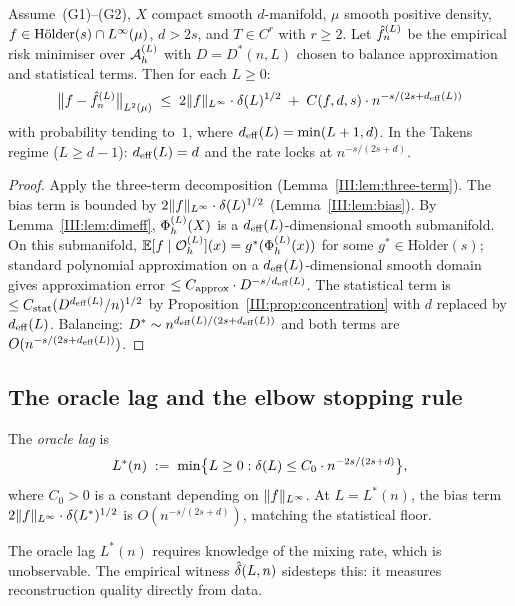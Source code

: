 \begin{proposition}
\label{III:prop:piecewise-rate}
Assume~(G1)--(G2), $X$ compact smooth $d$-manifold, $\mu$ smooth positive
density, $f \in \mathrm{H\ddot{o}lder}(s) \cap L^{\infty}(\mu)$, $d > 2s$,
and $T \in C^r$ with $r \geq 2$.
Let $\hat{f}_n^{(L)}$ be the empirical risk minimiser over $\mathcal{A}_h^{(L)}$ with $D = D^*(n,L)$
chosen to balance approximation and statistical terms.
Then for each $L \geq 0$:
\[
  \bigl\|f - \hat{f}_n^{(L)}\bigr\|_{L^{2}(\mu)}
  \;\leq\;
  2\|f\|_{L^{\infty}} \cdot \delta(L)^{1/2}
  \;+\;
  C(f,d,s) \cdot n^{-s/(2s+d_{\mathrm{eff}}(L))}
\]
with probability tending to~$1$, where $d_{\mathrm{eff}}(L) = \min(L+1,d)$.
In the Takens regime ($L \geq d-1$): $d_{\mathrm{eff}}(L) = d$ and the rate locks at
$n^{-s/(2s+d)}$.
\end{proposition}

\begin{proof}
Apply the three-term decomposition (Lemma~\ref{III:lem:three-term}).
The bias term is bounded by $2\|f\|_{L^{\infty}} \cdot \delta(L)^{1/2}$
(Lemma~\ref{III:lem:bias}).
By Lemma~\ref{III:lem:dimeff}, $\Phi_h^{(L)}(X)$ is a $d_{\mathrm{eff}}(L)$-dimensional smooth
submanifold.
On this submanifold, $\mathbb{E}[f \mid \mathcal{O}_h^{(L)}](x) = g^*(\Phi_h^{(L)}(x))$ for some
$g^* \in \mathrm{H\ddot{o}lder}(s)$; standard polynomial approximation on a
$d_{\mathrm{eff}}(L)$-dimensional smooth domain gives approximation error
$\leq C_{\mathrm{approx}} \cdot D^{-s/d_{\mathrm{eff}}(L)}$.
The statistical term is $\leq C_{\mathrm{stat}}(D^{d_{\mathrm{eff}}(L)}/n)^{1/2}$ by
Proposition~\ref{III:prop:concentration} with $d$ replaced by $d_{\mathrm{eff}}(L)$.
Balancing: $D^* \sim n^{d_{\mathrm{eff}}(L)/(2s+d_{\mathrm{eff}}(L))}$ and both terms are
$O(n^{-s/(2s+d_{\mathrm{eff}}(L))})$.
\end{proof}

\subsection{The oracle lag and the elbow stopping rule}

\begin{definition}
\label{III:def:oracle-lag}
The \emph{oracle lag} is
\[
  L^*(n) \;:=\; \min\bigl\{L \geq 0 : \delta(L) \leq C_0 \cdot n^{-2s/(2s+d)}\bigr\},
\]
where $C_0 > 0$ is a constant depending on $\|f\|_{L^{\infty}}$.
At $L = L^*(n)$, the bias term $2\|f\|_{L^{\infty}} \cdot \delta(L^*)^{1/2}$
is $O(n^{-s/(2s+d)})$, matching the statistical floor.
\end{definition}

The oracle lag $L^*(n)$ requires knowledge of the mixing rate, which is
unobservable.
The empirical witness $\hat{\delta}(L,n)$ sidesteps this: it measures reconstruction
quality directly from data.

